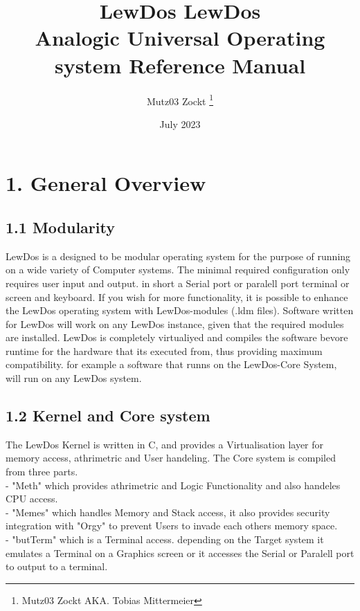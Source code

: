 \documentclass[12pt, letterpaper]{article}
\title{LewDos \myversion}
\author{Mutz03 Zockt \thanks{Mutz03 Zockt AKA. Tobias Mittermeier}}
\date{July 2023}
\title{\Large\bfseries LewDos \myversion \\ Analogic Universal Operating system Reference Manual}
\begin{document}
\maketitle
\newpage

\tableofcontents
\newpage

\section*{1. General Overview}
\subsection*{1.1 Modularity}
LewDos is a designed to be modular operating system for the purpose of running on a wide variety of Computer systems.
The minimal required configuration only requires user input and output. in short a Serial port or paralell port terminal or screen and keyboard.
If you wish for more functionality, it is possible to enhance the LewDos operating system with LewDos-modules (.ldm files).
Software written for LewDos will work on any LewDos instance, given that the required modules are installed. LewDos is completely virtualiyed and compiles the software bevore runtime
for the hardware that its executed from, thus providing maximum compatibility. for example a software that runns on the LewDos-Core System, will run on any LewDos system.
\subsection*{1.2 Kernel and Core system}
The LewDos Kernel is written in C, and provides a Virtualisation layer for memory access, athrimetric and User handeling. The Core system is compiled from three parts. \\
- "Meth" which provides athrimetric and Logic Functionality and also handeles CPU access. \\
- "Memes" which handles Memory and Stack access, it also provides security integration with "Orgy" to prevent Users to invade each others memory space. \\
- "butTerm" which is a Terminal access. depending on the Target system it emulates a Terminal on a Graphics screen or it accesses the Serial or Paralell port to output to a terminal. \\
\end{document}
